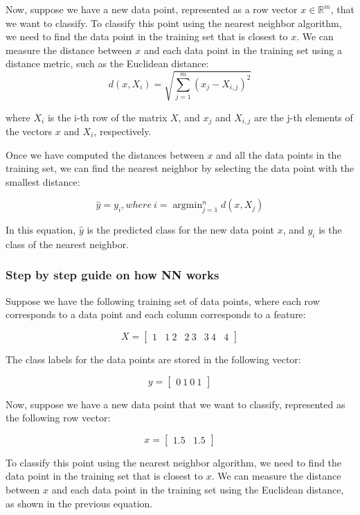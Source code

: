 \documentclass{article}
\theoremstyle{mytheoremstyle}
\theoremstyle{mytheoremstyle}
\theoremstyle{myproblemstyle}
\begin{document}
Now, suppose we have a new data point, represented as a row vector $x \in \mathbb{R}^m$, that we want to classify. To classify this point using the nearest neighbor algorithm, we need to find the data point in the training set that is closest to $x$. We can measure the distance between $x$ and each data point in the training set using a distance metric, such as the Euclidean distance:
$$d(x, X_i) = \sqrt{\sum_{j=1}^m (x_j - X_{i,j})^2}$$

where $X_i$ is the i-th row of the matrix $X$, and $x_j$ and $X_{i,j}$ are the j-th elements of the vectors $x$ and $X_i$, respectively.

Once we have computed the distances between $x$ and all the data points in the training set, we can find the nearest neighbor by selecting the data point with the smallest distance:

$$\hat{y} = y_i, where\ i = \operatorname{argmin}_{j=1}^n d(x, X_j)$$

In this equation, $\hat{y}$ is the predicted class for the new data point $x$, and $y_i$ is the class of the nearest neighbor.

\subsubsection{Step by step guide on how NN works}


Suppose we have the following training set of data points, where each row corresponds to a data point and each column corresponds to a feature:

$$X = \begin{bmatrix}
		1 & 1 \
		2 & 2 \
		3 & 3 \
		4 & 4
	\end{bmatrix}$$

The class labels for the data points are stored in the following vector:

$$y = \begin{bmatrix}
		0 \
		1 \
		0 \
		1
	\end{bmatrix}$$

Now, suppose we have a new data point that we want to classify, represented as the following row vector:

$$x = \begin{bmatrix}
		1.5 & 1.5
	\end{bmatrix}$$

To classify this point using the nearest neighbor algorithm, we need to find the data point in the training set that is closest to $x$. We can measure the distance between $x$ and each data point in the training set using the Euclidean distance, as shown in the previous equation.
\end{document}
